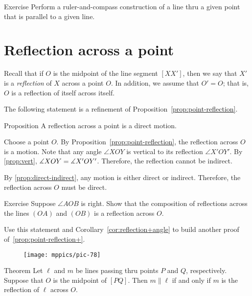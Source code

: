 \begin{thm}{Exercise}\label{ex:construction-parallel}
Perform a ruler-and-compass construction of a line thru a given point that is parallel to a given line.
\end{thm}

\section{Reflection across a point}

Recall that if $O$ is the midpoint of the line segment $[XX']$,
then we say that $X'$ is a \emph{reflection} of $X$ across a point $O$.
In addition, we assume that $O'=O$; that is, $O$ is a reflection of itself across itself.

The following statement is a refinement of Proposition~\ref{prop:point-reflection}.

\begin{thm}[\abs]{Proposition}\label{prop:point-reflection+}
A reflection across a point is a direct motion.
\end{thm}

Choose a point $O$.
By Proposition~\ref{prop:point-reflection}, the reflection across $O$ is a motion.
Note that any angle $\angle XOY$ is vertical to its reflection $\angle X'OY'$.
By \ref{prop:vert}, $\measuredangle XOY=\measuredangle X'OY'$.
Therefore, the reflection cannot be indirect.

By \ref{prop:direct-indirect}, any motion is either direct or indirect.
Therefore, the reflection across $O$ must be direct.
\qeds

\begin{thm}{Exercise}
Suppose $\angle AOB$ is right.
Show that the composition of reflections across the lines $(OA)$ and $(OB)$ is a reflection across $O$.

Use this statement and Corollary~\ref{cor:reflection+angle} to build another proof of~\ref{prop:point-reflection+}.
\end{thm}

{

\begin{wrapfigure}{r}{23mm}
\vskip-6mm
\centering
\texttt{[image: mppics/pic-78]}
\end{wrapfigure}


\begin{thm}{Theorem}\label{thm:parallel-point-reflection}
Let $\ell$ and $m$ be lines passing thru points $P$ and $Q$, respectively.
Suppose that $O$ is the midpoint of $[PQ]$.
Then $m \parallel \ell$ if and only if $m$ is the reflection of $\ell$ across $O$.
\end{thm}

}

